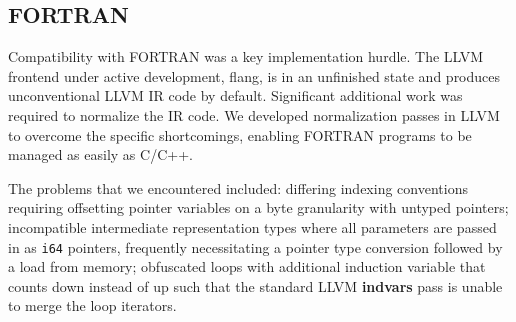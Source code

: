 

\subsection{FORTRAN}
Compatibility with FORTRAN was a key implementation hurdle. 
The LLVM frontend under active development, flang, is in an unfinished state and
produces unconventional LLVM IR code by default.
Significant additional work was required to normalize the IR code.
We developed normalization passes in LLVM to overcome the specific
shortcomings, enabling FORTRAN programs to be managed as easily as C/C++.

The problems that we encountered included: differing
indexing conventions requiring offsetting pointer variables 
on a byte granularity with untyped pointers;
incompatible intermediate representation types
where all parameters are passed in as \texttt{i64} pointers,
frequently necessitating a pointer type conversion followed
by a load from memory; obfuscated loops with additional induction variable that
counts down instead of up such that the standard LLVM \textbf{indvars} pass is
unable to merge the loop iterators.




